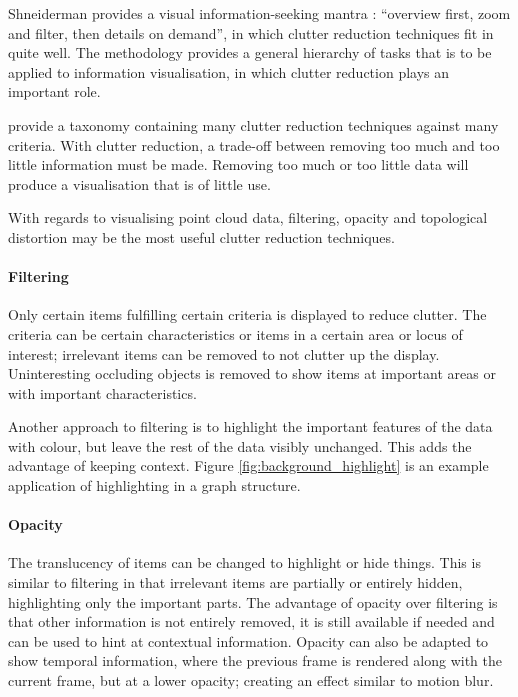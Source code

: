 Shneiderman provides a visual information-seeking mantra \citep{shneiderman96}:
``overview first, zoom and filter, then details on demand'', in which clutter
reduction techniques fit in quite well. The methodology provides a general hierarchy
of tasks that is to be applied to information visualisation, in which clutter
reduction plays an important role.

\citet{ellis07} provide a taxonomy containing many clutter reduction techniques
against many criteria. With clutter reduction, a trade-off between removing too
much and too little information must be made. Removing too much or too little
data will produce a visualisation that is of little use.

With regards to visualising point cloud data, filtering, opacity and topological
distortion may be the most useful clutter reduction techniques.

\paragraph{Filtering} Only certain items fulfilling certain criteria is
displayed to reduce clutter. The criteria can be certain characteristics or
items in a certain area or locus of interest; irrelevant items can be removed
to not clutter up the display. Uninteresting occluding objects is removed to
show items at important areas or with important characteristics.

Another approach to filtering is to highlight the important features of the
data with colour, but leave the rest of the data visibly unchanged. This adds
the advantage of keeping context. Figure \ref{fig:background_highlight} is an
example application of highlighting in a graph structure.

\paragraph{Opacity} The translucency of items can be changed to highlight or
hide things. This is similar to filtering in that irrelevant items are
partially or entirely hidden, highlighting only the important parts. The
advantage of opacity over filtering is that other information is not entirely
removed, it is still available if needed and can be used to hint at contextual
information. Opacity can also be adapted to show temporal information, where
the previous frame is rendered along with the current frame, but at a lower
opacity; creating an effect similar to motion blur.

